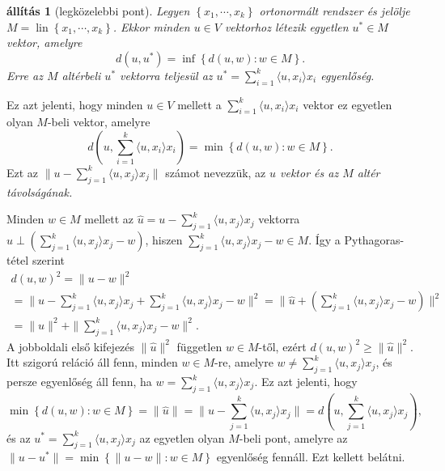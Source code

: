 \documentclass[9pt, a4paper, showtrims]{memoir}
\makeatletter
\renewenvironment{proof}[1][\proofname]
    {\par\pushQED{\qed}%
    \normalfont \topsep6\p@\@plus6\p@\relax
    \trivlist
    \item[\hskip\labelsep
        \itshape
    #1\@addpunct{:}]\ignorespaces}
    {\popQED\endtrivlist\@endpefalse}
\theoremstyle{plain}
\newtheorem{proposition}{állítás}[chapter]
\theoremstyle{remark}
\theoremstyle{definition}
\DeclareMathOperator{\lin}{lin}
\newcommand{\ip}[2]{\langle#1,#2\rangle}
\makeatother
\begin{document}
\begin{proposition}[legközelebbi pont]\label{pr:legkozelebb}
    Legyen $\left\{ x_1,\cdots,x_k \right\}$ ortonormált rendszer és 
    jelölje $M=\lin\left\{ x_1,\cdots,x_k \right\}$.
    Ekkor minden $u\in V$ vektorhoz létezik egyetlen $u^\ast\in M$
    vektor, amelyre
    \[
        d\left( u,u^\ast\right)
        =
        \inf\left\{ d\left( u,w \right):w\in M \right\}.
    \]
    Erre az $M$ altérbeli $u^\ast$ vektorra teljesül az $u^\ast=\sum_{i=1}^k\ip{u}{x_i}x_i$ egyenlőség.
\end{proposition}
Ez azt jelenti, 
hogy minden $u\in V$ mellett a 
    $\sum_{i=1}^k\ip{u}{x_i}x_i$
    vektor ez egyetlen olyan $M$-beli vektor, amelyre
    \[
        d\left( u,\sum_{i=1}^k\ip{u}{x_i}x_i \right)
        =
        \min\left\{ d\left( u,w \right):w\in M \right\}.
    \]
    Ezt az 
    \begin{math}
        \|u-\sum_{j=1}^k\ip{u}{x_j}x_j\|
    \end{math}
    számot nevezzük, az \emph{$u$ vektor és az $M$ altér távolságának.}
\begin{proof}
    Minden $w\in M$ mellett az $\hat{u}=u-\sum_{j=1}^k\ip{u}{x_j}x_j$ vektorra 
    $\hat{u}\perp \left( \sum_{j=1}^k\ip{u}{x_j}x_j-w \right)$,
    hiszen $\sum_{j=1}^k\ip{u}{x_j}x_j-w\in M$.
    Így a Pythagoras-tétel szerint
    \begin{multline*}
        d\left( u,w \right)^2
        =
        \|u-w\|^2
        \\
        =
        \|u-\sum_{j=1}^k\ip{u}{x_j}x_j+\sum_{j=1}^k\ip{u}{x_j}x_j-w\|^2
        =
        \|\hat{u}+\left( \sum_{j=1}^k\ip{u}{x_j}x_j-w \right)\|^2
        \\
        =
        \|\hat{u}\|^2+\|\sum_{j=1}^k\ip{u}{x_j}x_j-w\|^2.
    \end{multline*}
    A jobboldali első kifejezés $\|\hat{u}\|^2$ független $w\in M$-től,
    ezért 
    \begin{math}
        d\left( u,w \right)^2
        \geq
        \|\hat{u}\|^2.
    \end{math}
    Itt szigorú reláció áll fenn, minden $w\in M$-re, amelyre 
    $w\neq\sum_{j=1}^k\ip{u}{x_j}x_j $, 
    és persze egyenlőség áll fenn, ha 
    $w=\sum_{j=1}^k\ip{u}{x_j}x_j $.
    Ez azt jelenti,
    hogy 
    \[
        \min\left\{ d\left( u,w \right):w\in M \right\}
        =
        \|\hat{u}\|
        =
        \| u-\sum_{j=1}^k\ip{u}{x_j}x_j\|
        =
        d\left( u,\sum_{j=1}^k\ip{u}{x_j}x_j\right),
    \]
    és az $u^\ast=\sum_{j=1}^k\ip{u}{x_j}x_j $ az egyetlen olyan $M$-beli pont, amelyre 
    az
    $\|u-u^\ast\|=\min\left\{ \|u-w\|:w\in M  \right\}$ egyenlőség fennáll.
    Ezt kellett belátni. 
\end{proof}
\end{document}
